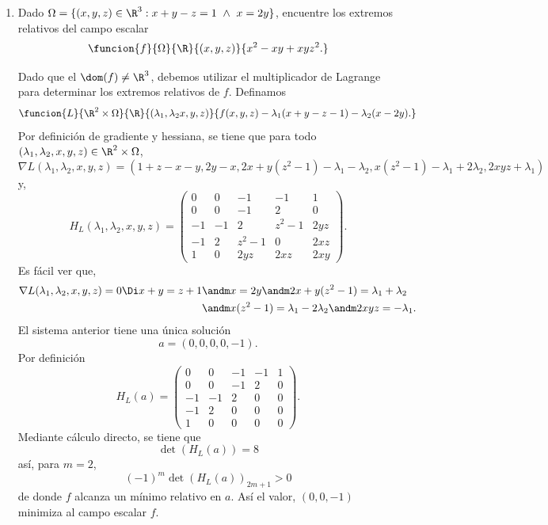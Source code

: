 \documentclass[a4,11pt]{aleph-examen}
\begin{document}
\begin{preguntas}
\begin{respuesta}
\begin{respuesta}
\begin{respuesta}
\begin{enumerate}
\item 
    Dado $\Omega=\{(x,y,z)\in\R^3:x+y-z=1\ \wedge \ x=2y \}$, encuentre los extremos relativos del campo escalar
    \[
        \funcion{f}{\Omega}{\R}{(x,y,z)}{x^2-xy+xyz^2.}
    \]
    
\begin{respuesta}
    Dado que el $\dom(f)\neq \R^3$, debemos utilizar el multiplicador de Lagrange para determinar los extremos relativos de $f$. Definamos
    \[
        \funcion{L}{\R^2\times \Omega}{\R}{(\lambda_1,\lambda_2 x,y,z)}{f(x,y,z)-\lambda_1(x+y-z-1)-\lambda_2(x-2y).}
    \]
    Por definición de gradiente y hessiana, se tiene que para todo $(\lambda_1,\lambda_2,x,y,z)\in \R^2\times \Omega$,
    \[
        \nabla L(\lambda_1,\lambda_2,x,y,z)
        =(
        1+z-x-y,2y-x,2x+y(z^2-1)-\lambda_1-\lambda_2,
        x(z^2-1)-\lambda_1+2\lambda_2,
        2xyz+\lambda_1
        )
    \]
    y,
    \[
        H_L(\lambda_1,\lambda_2, x,y,z)=
        \begin{pmatrix}
            0&0&-1&-1&1\\
            0&0&-1&2&0\\
            -1&-1&2&z^2-1&2yz\\
            -1&2&z^2-1&0&2xz\\
            1&0&2yz&2xz&2xy
        \end{pmatrix}.        
    \]
    Es fácil ver que,
    \begin{align*}
        \nabla L(\lambda_1,\lambda_2,x,y,z)=0 
        \Di x+y=z+1 &\andm x=2y\andm 2x+y(z^2-1)=\lambda_1+\lambda_2\\
        &\andm x(z^2-1)=\lambda_1-2\lambda_2
        \andm 2xyz=-\lambda_1.
    \end{align*}
    El sistema anterior tiene una única solución
    \[
        a=(0,0,0,0,-1).
    \]
    Por definición
    \[
        H_L(a)=
        \begin{pmatrix}
            0&0&-1&-1&1\\
            0&0&-1&2&0\\
            -1&-1&2&0&0\\
            -1&2&0&0&0\\
            1&0&0&0&0
        \end{pmatrix}.        
    \]
    Mediante cálculo directo, se tiene que
    \[
        \det(H_L(a))=8
    \]
    así, para $m=2$,
    \[
        (-1)^m\det(H_L(a))_{2m+1}>0
    \]
    de donde $f$ alcanza un mínimo relativo en $a$. Así el valor, $(0,0,-1)$ minimiza al campo escalar $f$.
    

\end{respuesta}
\end{enumerate}
\end{respuesta}
\end{respuesta}
\end{respuesta}
\end{preguntas}
\end{document}

